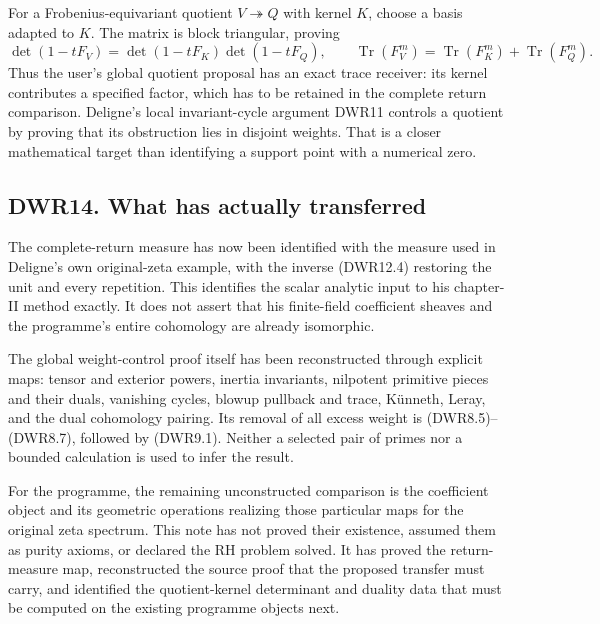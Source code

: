 For a Frobenius-equivariant quotient \(V\twoheadrightarrow Q\) with
kernel \(K\), choose a basis adapted to \(K\). The matrix is block
triangular, proving \[
\det(1-tF_V)=\det(1-tF_K)\det(1-tF_Q),
\qquad\operatorname{Tr}(F_V^m)=\operatorname{Tr}(F_K^m)+\operatorname{Tr}(F_Q^m).
\tag{DWR13.3}
\] Thus the user's global quotient proposal has an exact trace receiver:
its kernel contributes a specified factor, which has to be retained in
the complete return comparison. Deligne's local invariant-cycle argument
DWR11 controls a quotient by proving that its obstruction lies in
disjoint weights. That is a closer mathematical target than identifying
a support point with a numerical zero.

\subsection{DWR14. What has actually
transferred}\label{dwr14.-what-has-actually-transferred}

The complete-return measure has now been identified with the measure
used in Deligne's own original-zeta example, with the inverse (DWR12.4)
restoring the unit and every repetition. This identifies the scalar
analytic input to his chapter-II method exactly. It does not assert that
his finite-field coefficient sheaves and the programme's entire
cohomology are already isomorphic.

The global weight-control proof itself has been reconstructed through
explicit maps: tensor and exterior powers, inertia invariants, nilpotent
primitive pieces and their duals, vanishing cycles, blowup pullback and
trace, Künneth, Leray, and the dual cohomology pairing. Its removal of
all excess weight is (DWR8.5)--(DWR8.7), followed by (DWR9.1). Neither a
selected pair of primes nor a bounded calculation is used to infer the
result.

For the programme, the remaining unconstructed comparison is the
coefficient object and its geometric operations realizing those
particular maps for the original zeta spectrum. This note has not proved
their existence, assumed them as purity axioms, or declared the RH
problem solved. It has proved the return-measure map, reconstructed the
source proof that the proposed transfer must carry, and identified the
quotient-kernel determinant and duality data that must be computed on
the existing programme objects next.
